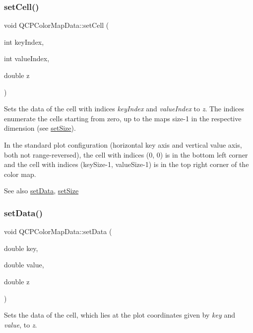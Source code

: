 \subsubsection{\texorpdfstring{set\+Cell()}{setCell()}}
{\footnotesize\ttfamily void Q\+C\+P\+Color\+Map\+Data\+::set\+Cell (\begin{DoxyParamCaption}\item[{int}]{key\+Index,  }\item[{int}]{value\+Index,  }\item[{double}]{z }\end{DoxyParamCaption})}

Sets the data of the cell with indices {\itshape key\+Index} and {\itshape value\+Index} to {\itshape z}. The indices enumerate the cells starting from zero, up to the map\textquotesingle{}s size-\/1 in the respective dimension (see \hyperlink{classQCPColorMapData_a0d9ff35c299d0478b682bfbcdd9c097e}{set\+Size}).

In the standard plot configuration (horizontal key axis and vertical value axis, both not range-\/reversed), the cell with indices (0, 0) is in the bottom left corner and the cell with indices (key\+Size-\/1, value\+Size-\/1) is in the top right corner of the color map.

\begin{DoxySeeAlso}{See also}
\hyperlink{classQCPColorMapData_afd2083ccfd6987ec94aa7ef8e91ca39a}{set\+Data}, \hyperlink{classQCPColorMapData_a0d9ff35c299d0478b682bfbcdd9c097e}{set\+Size} 
\end{DoxySeeAlso}
\mbox{\label{classQCPColorMapData_afd2083ccfd6987ec94aa7ef8e91ca39a}} 
\subsubsection{\texorpdfstring{set\+Data()}{setData()}}
{\footnotesize\ttfamily void Q\+C\+P\+Color\+Map\+Data\+::set\+Data (\begin{DoxyParamCaption}\item[{double}]{key,  }\item[{double}]{value,  }\item[{double}]{z }\end{DoxyParamCaption})}

Sets the data of the cell, which lies at the plot coordinates given by {\itshape key} and {\itshape value}, to {\itshape z}.

